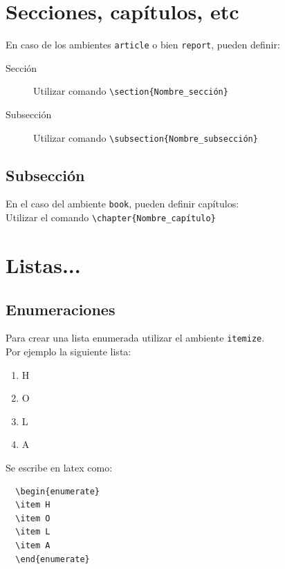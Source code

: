 \documentclass[11pt]{article} %
\begin{document}
\section{Secciones, capítulos, etc}

En caso de los ambientes \verb!article! o bien \verb!report!, pueden definir:
\begin{description}
\item[Sección] Utilizar comando \verb!\section{Nombre_sección}!
\item[Subsección] Utilizar comando \verb!\subsection{Nombre_subsección}!
\end{description}

\subsection{Subsección}
En el caso del ambiente \verb!book!, pueden definir capítulos:\\
Utilizar el comando \verb!\chapter{Nombre_capítulo}!

\section{Listas...}
\subsection{Enumeraciones}
Para crear una lista enumerada utilizar el ambiente \texttt{itemize}.\\
Por ejemplo la siguiente lista:
\begin{enumerate}
\item H
\item O
\item L
\item A
\end{enumerate}
Se escribe en latex como:
\begin{verbatim}
  \begin{enumerate}
  \item H
  \item O
  \item L
  \item A
  \end{enumerate}
\end{verbatim}
\end{document}
